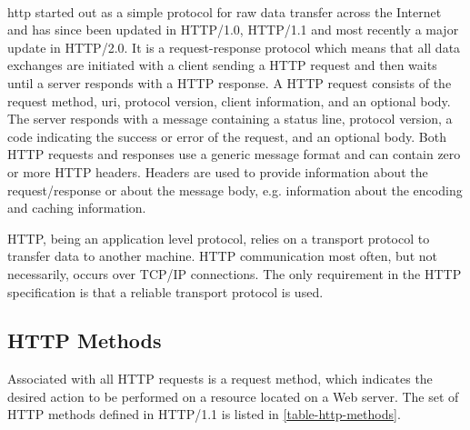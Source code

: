 \paragraph{}

\gls{http} started out as a simple protocol for raw data transfer across the
Internet and has since been updated in HTTP/1.0, HTTP/1.1 and most recently a
major update in HTTP/2.0. It is a request-response protocol which means that all
data exchanges are initiated with a client sending a HTTP request and then waits
until a server responds with a HTTP response. A HTTP request consists of the
request method, \gls{uri}, protocol version, client information, and an optional
body. The server responds with a message containing a status line, protocol
version, a code indicating the success or error of the request, and an optional
body. Both HTTP requests and responses use a generic message format and can
contain zero or more HTTP headers. Headers are used to provide information about
the request/response or about the message body, e.g. information about the
encoding and caching information.

HTTP, being an application level protocol, relies on a transport protocol to
transfer data to another machine. HTTP communication most often, but not
necessarily, occurs over TCP/IP connections. The only requirement in the HTTP
specification is that a reliable transport protocol is used.

\subsection{HTTP Methods}

 Associated with all HTTP requests is a request method, which indicates the
 desired action to be performed on a resource located on a Web server. The set
 of HTTP methods defined in HTTP/1.1 is listed in \cref{table-http-methods}.

